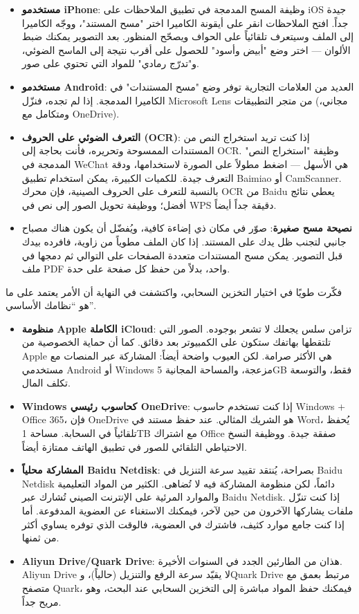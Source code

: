 \begin{itemize}
  \item \textbf{مستخدمو iPhone}: وظيفة المسح المدمجة في تطبيق الملاحظات على iOS جيدة جداً. افتح الملاحظات انقر على أيقونة الكاميرا اختر "مسح المستند"، ووجّه الكاميرا إلى الملف وسيتعرف تلقائياً على الحواف ويصحّح المنظور. بعد التصوير يمكنك ضبط الألوان — اختر وضع "أبيض وأسود" للحصول على أقرب نتيجة إلى الماسح الضوئي، و"تدرّج رمادي" للمواد التي تحتوي على صور.
  \item \textbf{مستخدمو Android}: العديد من العلامات التجارية توفر وضع "مسح المستندات" في الكاميرا المدمجة. إذا لم تجده، فنزّل Microsoft Lens من متجر التطبيقات (مجاني، ومتكامل مع OneDrive).
  \item \textbf{التعرف الضوئي على الحروف (OCR)}: إذا كنت تريد استخراج النص من المستندات الممسوحة وتحريره، فأنت بحاجة إلى OCR. وظيفة "استخراج النص" المدمجة في WeChat هي الأسهل — اضغط مطولاً على الصورة لاستخدامها، ودقة التعرف جيدة. للكميات الكبيرة، يمكن استخدام تطبيق Baimiao أو CamScanner. بالنسبة للتعرف على الحروف الصينية، فإن محرك OCR من Baidu يعطي نتائج أفضل؛ ووظيفة تحويل الصور إلى نص في WPS دقيقة جداً أيضاً.
  \item \textbf{نصيحة مسح صغيرة}: صوّر في مكان ذي إضاءة كافية، ويُفضّل أن يكون هناك مصباح جانبي لتجنب ظل يدك على المستند. إذا كان الملف مطوياً من زاوية، فافرده بيدك قبل التصوير. يمكن مسح المستندات متعددة الصفحات على التوالي ثم دمجها في ملف PDF واحد، بدلاً من حفظ كل صفحة على حدة.
\end{itemize}


فكّرت طويًا في اختيار التخزين السحابي، واكتشفت في النهاية أن الأمر يعتمد على ما هو “نظامك الأساسي”.

\begin{itemize}
  \item \textbf{منظومة Apple الكاملة iCloud}: تزامن سلس يجعلك لا تشعر بوجوده. الصور التي تلتقطها بهاتفك ستكون على الكمبيوتر بعد دقائق. كما أن حماية الخصوصية من Apple هي الأكثر صرامة. لكن العيوب واضحة أيضاً: المشاركة عبر المنصات مع مستخدمي Android أو Windows مزعجة، والمساحة المجانية 5GB فقط، والتوسعة تكلف المال.
  \item \textbf{Windows كحاسوب رئيسي OneDrive}: إذا كنت تستخدم حاسوب Windows + Office 365، فإن OneDrive هو الشريك المثالي. عند حفظ مستند في Word، يُحفظ تلقائياً في السحابة. مساحة 1TB مع اشتراك Office صفقة جيدة. ووظيفة النسخ الاحتياطي التلقائي للصور في تطبيق الهاتف ممتازة أيضاً.
  \item \textbf{المشاركة محلياً Baidu Netdisk}: بصراحة، يُنتقد تقييد سرعة التنزيل في Baidu Netdisk دائماً، لكن منظومة المشاركة فيه لا تُضاهى. الكثير من المواد التعليمية والموارد المرئية على الإنترنت الصيني تُشارك عبر Baidu Netdisk. إذا كنت تنزّل ملفات يشاركها الآخرون من حين لآخر، فيمكنك الاستغناء عن العضوية المدفوعة. أما إذا كنت جامع موارد كثيف، فاشترك في العضوية، فالوقت الذي توفره يساوي أكثر من ثمنها.
  \item \textbf{Aliyun Drive/Quark Drive}: هذان من الطارئين الجدد في السنوات الأخيرة. Aliyun Drive لا يقيّد سرعة الرفع والتنزيل (حالياً)، وQuark Drive مرتبط بعمق مع متصفح Quark، فيمكنك حفظ المواد مباشرة إلى التخزين السحابي عند البحث، وهو مريح جداً.
\end{itemize}

